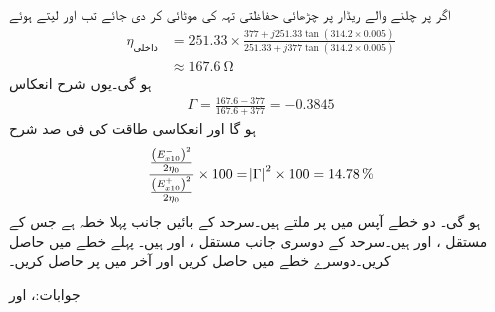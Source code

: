 اگر  پر چلنے والے ریڈار پر چڑھائی حفاظتی تہہ کی موٹائی  کر دی جائے تب  اور  لیتے ہوئے
\begin{align*}
\eta_{\text{داخلی}}&=251.33 \times \frac{377+j 251.33 \tan (314.2 \times 0.005)}{251.33+j 377 \tan(314.2\times 0.005)}\\
&\approx \SI{167.6}{\ohm}
\end{align*}
ہو گی۔یوں شرح انعکاس
\begin{align*}
\Gamma=\frac{167.6-377}{167.6+377}=-0.3845
\end{align*}
ہو گا اور انعکاسی طاقت کی فی صد شرح
\begin{align*}
\frac{\frac{\left(E_{x10}^-\right)^2}{2\eta_0}}{\frac{\left(E_{x10}^+\right)^2}{2\eta_0}} \times 100=\abs{\Gamma}^2 \times 100=\SI{14.78}{\%}
\end{align*}
ہو گی۔
دو خطے آپس میں  پر ملتے ہیں۔سرحد کے بائیں جانب پہلا خطہ ہے جس کے مستقل ،  اور  ہیں۔سرحد کے دوسری جانب مستقل ،  اور  ہیں۔ پہلے خطے میں  حاصل کریں۔دوسرے خطے میں  حاصل کریں اور آخر میں  پر  حاصل کریں۔

جوابات:،  اور 
